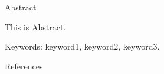 \documentclass[12pt, twoside , openright]{book}
\begin{document}
{}
\begin{center}
	{\chinnesesize Abstract}
\end{center}

This is Abstract. \blindtext[1]


\noindent Keywords: keyword1, keyword2, keyword3.
\newpage




\tableofcontents
\newpage




\listoffigures
\newpage




\listoftables
\newpage




\mainmatter



% 
% 
% 
% 
% 
% 

% 
% 
% 
% 
% 







% 
% 
% 
% 



{}
\begin{center}
	{\chinnesesize References}
\end{center}



\newpage
\mbox{}
\newpage
\end{document}
